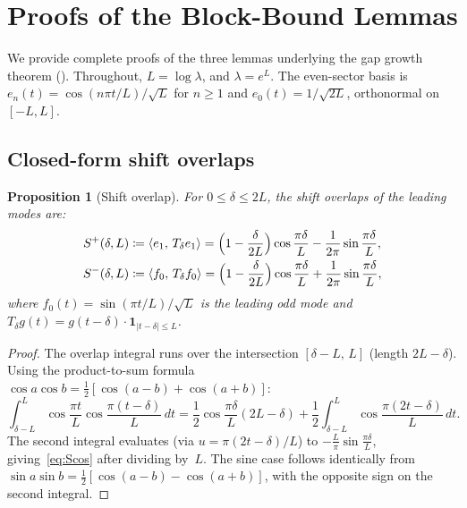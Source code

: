 \documentclass[12pt,a4paper]{article}
\newtheorem{proposition}[theorem]{Proposition}
\theoremstyle{definition}
\theoremstyle{remark}
\begin{document}
\appendix
\section{Proofs of the Block-Bound Lemmas}
\label{app:block-proofs}

We provide complete proofs of the three lemmas underlying the gap growth theorem (). Throughout, $L = \log\lambda$, and $\lambda = e^L$. The even-sector basis is $e_n(t) = \cos(n\pi t/L)/\sqrt{L}$ for $n \geq 1$ and $e_0(t) = 1/\sqrt{2L}$, orthonormal on $[-L, L]$.

\subsection{Closed-form shift overlaps}

\begin{proposition}[Shift overlap]
\label{prop:overlap-closed}
For $0 \leq \delta \leq 2L$, the shift overlaps of the leading modes are:
\begin{align}
  S^+(\delta, L) &\coloneqq \langle e_1,\, T_\delta e_1\rangle = \Bigl(1 - \frac{\delta}{2L}\Bigr)\cos\frac{\pi\delta}{L} - \frac{1}{2\pi}\sin\frac{\pi\delta}{L}, \label{eq:Scos} \\
  S^-(\delta, L) &\coloneqq \langle f_0,\, T_\delta f_0\rangle = \Bigl(1 - \frac{\delta}{2L}\Bigr)\cos\frac{\pi\delta}{L} + \frac{1}{2\pi}\sin\frac{\pi\delta}{L}, \label{eq:Ssin}
\end{align}
where $f_0(t) = \sin(\pi t/L)/\sqrt{L}$ is the leading odd mode and $T_\delta g(t) = g(t - \delta)\cdot\mathbf{1}_{|t-\delta|\leq L}$.
\end{proposition}

\begin{proof}
The overlap integral runs over the intersection $[\delta - L,\,L]$ (length $2L - \delta$). Using the product-to-sum formula $\cos a\cos b = \tfrac{1}{2}[\cos(a-b) + \cos(a+b)]$:
\[
  \int_{\delta-L}^{L} \cos\frac{\pi t}{L}\cos\frac{\pi(t-\delta)}{L}\,dt
  = \frac{1}{2}\cos\frac{\pi\delta}{L}(2L - \delta) + \frac{1}{2}\int_{\delta-L}^{L}\cos\frac{\pi(2t-\delta)}{L}\,dt.
\]
The second integral evaluates (via $u = \pi(2t-\delta)/L$) to $-\frac{L}{\pi}\sin\frac{\pi\delta}{L}$, giving~\eqref{eq:Scos} after dividing by~$L$. The sine case follows identically from $\sin a\sin b = \tfrac{1}{2}[\cos(a-b) - \cos(a+b)]$, with the opposite sign on the second integral.
\end{proof}
\end{document}
